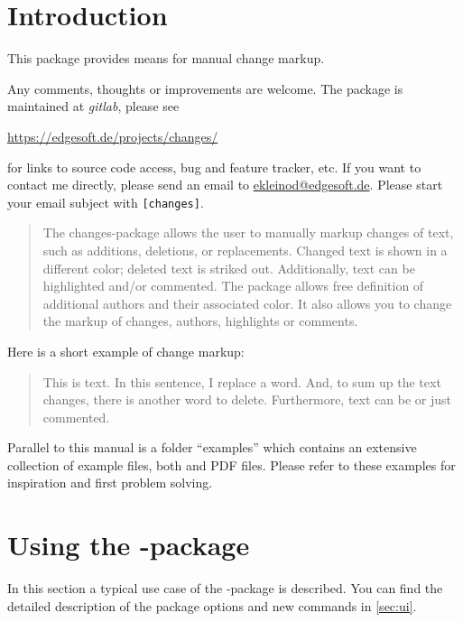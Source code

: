 \section{Introduction}

This package provides means for manual change markup.

Any comments, thoughts or improvements are welcome.
The package is maintained at \emph{gitlab}, please see

\url{https://edgesoft.de/projects/changes/}

for links to source code access, bug and feature tracker, etc.
If you want to contact me directly, please send an email to \href{mailto:ekleinod@edgesoft.de}{ekleinod@edgesoft.de}.
Please start your email subject with \texttt{[changes]}.

\begin{quote}
	The changes-package allows the user to manually markup changes of text, such as additions, deletions, or replacements.
	Changed text is shown in a different color; deleted text is striked out.
	Additionally, text can be highlighted and/or commented.
	The package allows free definition of additional authors and their associated color.
	It also allows you to change the markup of changes, authors, highlights or comments.
\end{quote}

Here is a short example of change markup:

\begin{quote}
	This is  text.
	In this sentence, I replace a  word.
	And, to sum up the text changes, there is another  word to delete.
	Furthermore, text can be  or just commented.
\end{quote}

Parallel to this manual is a folder ``examples'' which contains an extensive collection of example files, both  and PDF files.
Please refer to these examples for inspiration and first problem solving.


\cleardoublepage
\section{Using the -package}
\label{sec:usage}

In this section a typical use case of the -package is described.
You can find the detailed description of the package options and new commands in \autoref{sec:ui}.

